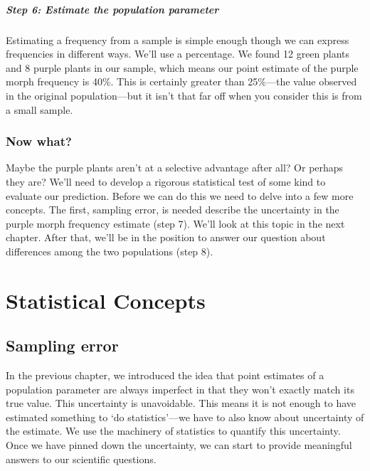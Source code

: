 \documentclass[
]{book}
\begin{document}
\hypertarget{step-6-estimate-the-population-parameter-1}{%
\subsubsection*{Step 6: Estimate the population parameter}\label{step-6-estimate-the-population-parameter-1}}

Estimating a frequency from a sample is simple enough though we can express frequencies in different ways. We'll use a percentage. We found 12 green plants and 8 purple plants in our sample, which means our point estimate of the purple morph frequency is 40\%. This is certainly greater than 25\%---the value observed in the original population---but it isn't that far off when you consider this is from a small sample.

\hypertarget{now-what}{%
\section{Now what?}\label{now-what}}

Maybe the purple plants aren't at a selective advantage after all? Or perhaps they are? We'll need to develop a rigorous statistical test of some kind to evaluate our prediction. Before we can do this we need to delve into a few more concepts. The first, sampling error, is needed describe the uncertainty in the purple morph frequency estimate (step 7). We'll look at this topic in the next chapter. After that, we'll be in the position to answer our question about differences among the two populations (step 8).

\hypertarget{part-statistical-concepts}{%
\part{Statistical Concepts}\label{part-statistical-concepts}}

\hypertarget{sampling-error}{%
\chapter{Sampling error}\label{sampling-error}}

In the previous chapter, we introduced the idea that point estimates of a population parameter are always imperfect in that they won't exactly match its true value. This uncertainty is unavoidable. This means it is not enough to have estimated something to `do statistics'---we have to also know about uncertainty of the estimate. We use the machinery of statistics to quantify this uncertainty. Once we have pinned down the uncertainty, we can start to provide meaningful answers to our scientific questions.
\end{document}
